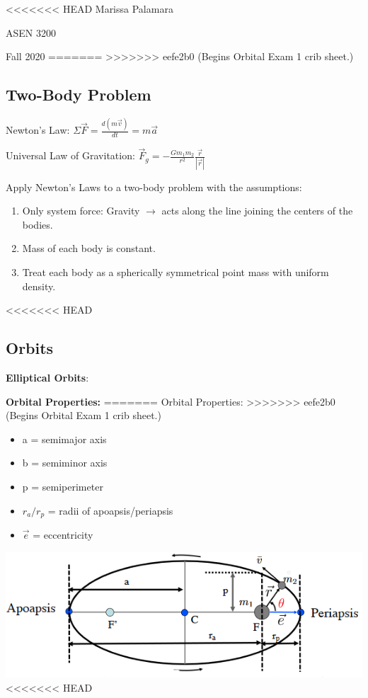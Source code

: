 \documentclass{article}
\begin{document}
\begin{multicols*}{3}
<<<<<<< HEAD
    Marissa Palamara\par 
    ASEN 3200\par 
    Fall 2020
    \vspace{-0.5cm}
=======
>>>>>>> eefe2b0 (Begins Orbital Exam 1 crib sheet.)
    \subsection*{Two-Body Problem}
    Newton's Law: $\Sigma \vec{F}=\frac{d(m\vec{v})}{dt}=m\vec{a}$ \par
    Universal Law of Gravitation: $\vec{F}_g=-\frac{Gm_1m_2}{r^2}\frac{\vec{r}}{|\vec{r}|}$\par 
    Apply Newton's Laws to a two-body problem with the assumptions:
    \begin{enumerate}
        \itemsep0em
        \item Only system force: Gravity $\rightarrow$ acts along the line joining the centers of the bodies.
        \item Mass of each body is constant.
        \item Treat each body as a spherically symmetrical point mass with uniform density.
    \end{enumerate}
<<<<<<< HEAD
    \subsection*{Orbits}
    \textbf{Elliptical Orbits}:\par
    \textbf{Orbital Properties:}
=======
    Orbital Properties:
>>>>>>> eefe2b0 (Begins Orbital Exam 1 crib sheet.)
    \begin{itemize}
        \itemsep0em
        \item a = semimajor axis
        \item b = semiminor axis
        \item p = semiperimeter
        \item $r_a/r_p$ = radii of apoapsis/periapsis
        \item $\vec{e}$ = eccentricity
    \end{itemize}
    \includegraphics[width=\linewidth]{Figures/orbital_properties.png}
<<<<<<< HEAD


\end{multicols*}
\end{document}
